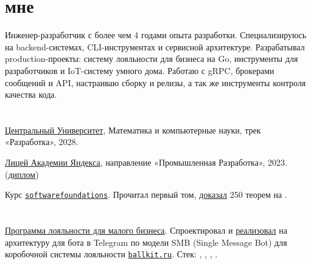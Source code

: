 \documentclass[margin,line]{resume}
\begin{document}
\begin{resume}

  \section{ мне}
  Инженер-разработчик с более чем 4 годами опыта разработки. Специализируюсь на
  backend-системах, CLI-инструментах и сервисной архитектуре. Разрабатывал
  production-проекты: систему лояльности для бизнеса на Go, инструменты для
  разработчиков и IoT-систему умного дома. Работаю с gRPC, брокерами сообщений
  и API, настраиваю сборку и релизы, а так же инструменты контроля
  качества кода.

  \vspace{-1mm}

  \section{}
  \href{https://cu.ru/}{Центральный Университет},
  Математика и компьютерные науки, трек «Разработка», 2028.

  \href{https://lyceum.yandex.ru/}{Лицей
  Академии Яндекса}, направление «Промышленная Разработка», 2023.
  (\href{https://alchemmist.github.io/CV/attachments/yandex-lyceum.pdf}{диплом})

  Курс
  \texttt{\href{https://softwarefoundations.cis.upenn.edu}{softwarefoundations}}.
  Прочитал первый том,
  \href{https://github.com/alchemmist/coq-learning}{доказал} 250
  теорем на .

  \vspace{-1mm}

  \section{}\vspace{0mm}
  \begin{description}[leftmargin=0pt, itemindent=*, itemsep=8pt]
    \item[Ballkit:]\small\href{https://github.com/ballkit}{Программа
      лояльности для малого бизнеса}.
      Спроектировал и
      \href{https://github.com/ballkit/ballkit-platform}{реализовал}
      на  архитектуру для бота в Telegram по модели
      SMB (Single Message Bot) для коробочной системы лояльности
      \href{https://ballkit.ru}{\texttt{ballkit.ru}}.
      Стек:
      ,
      , ,
      .


\end{description}
\end{resume}
\end{document}
